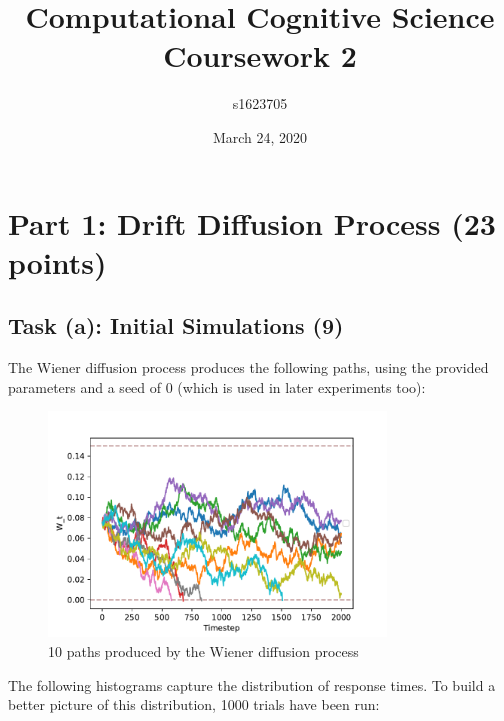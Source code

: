 \documentclass{article}
\title{Computational Cognitive Science Coursework 2}
\author{s1623705}
\date{March 24, 2020}
\begin{document}
\maketitle

\section{Part 1: Drift Diffusion Process (23 points)}

\subsection{Task (a): Initial Simulations (9)}

The Wiener diffusion process produces the following paths, using the provided parameters and a seed of 0 (which is used in later experiments too):

\begin{figure}[H]
    \centering
    \includegraphics[width=0.8\textwidth]{figures/part1/task1/example_paths.pdf}
    \caption{10 paths produced by the Wiener diffusion process}
    \label{fig:examplepaths}
\end{figure}

The following histograms capture the distribution of response times. To build a better picture of this distribution, 1000 trials have been run:
\end{document}
